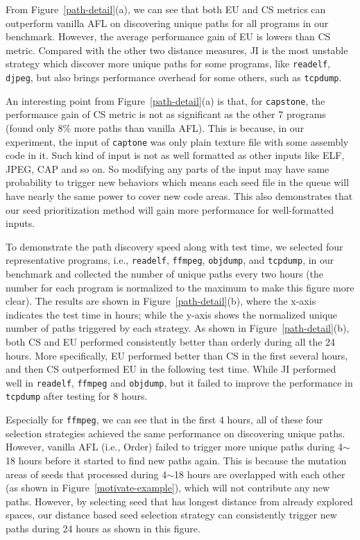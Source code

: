 From Figure~\ref{path-detail}(a), we can see that both EU and CS metrics 
can outperform vanilla AFL on discovering unique paths for all programs 
in our benchmark. However, the average performance gain of EU is 
lowers than CS metric. 
Compared with the other two distance measures, JI is the most unstable 
strategy which discover more unique paths for some programs, like 
\texttt{readelf}, \texttt{djpeg}, but also brings performance overhead 
for some others, such as \texttt{tcpdump}.

An interesting point from Figure~\ref{path-detail}(a) is that, for 
\texttt{capstone}, the performance gain of CS metric is not as 
significant as the other 7 programs (found only 8\% more paths 
than vanilla AFL).
This is because, in our experiment, the input of \texttt{captone} 
was only plain texture file with some assembly code in it. Such kind 
of input is not as well formatted as other inputs like ELF, JPEG, 
CAP and so on. 
So modifying any parts of the input may have same probability to
 trigger new behaviors which means each seed file in the queue 
 will have nearly the same power to cover new code areas. This 
 also demonstrates that our seed prioritization method will gain 
 more performance for well-formatted inputs.

To demonstrate the path discovery speed along with test time, 
we selected four representative programs, i.e., \texttt{readelf}, 
\texttt{ffmpeg}, \texttt{objdump}, and \texttt{tcpdump}, in our 
benchmark and collected the number of unique paths every two 
hours (the number for each program is normalized to the 
maximum to make this figure more clear).
The results are shown in Figure~\ref{path-detail}(b), where 
the x-axis indicates the test time in hours; while the y-axis 
shows the normalized unique number of paths triggered 
by each strategy.
As shown in Figure~\ref{path-detail}(b), both CS and EU performed 
consistently better than orderly during all the 24 hours.
More specifically, EU performed better than CS in the first 
several hours, and then CS outperformed EU in the following test time.
While JI performed well in \texttt{readelf}, \texttt{ffmpeg} and 
\texttt{objdump}, but it failed to improve the performance in 
\texttt{tcpdump} after testing for 8 hours.
 
Especially for \texttt{ffmpeg}, we can see that in the first 4 hours, 
all of these four selection strategies achieved the same 
performance on discovering unique paths. However, vanilla AFL 
(i.e., Order) failed to trigger more unique paths during 4$\sim$18 
hours before it started to find new paths again.
This is because the mutation areas of seeds that processed 
during 4$\sim$18 hours are overlapped with each other 
(as shown in Figure~\ref{motivate-example}), which will not 
contribute any new paths. However, by selecting seed that has 
longest distance from already explored spaces, our distance based 
seed selection strategy can consistently trigger new paths 
during 24 hours as shown in this figure.

